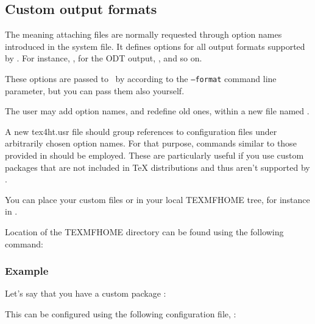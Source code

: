 
\subsection{Custom output formats}

The meaning attaching files are normally requested through option names
introduced in the  system file. It defines options for all output formats
supported by \texfourht. For instance, ,  for the ODT output,
, and so on. 

These options are passed to \texfourht\ by \makefourht according to the \texttt{--format} 
command line parameter, but you can pass them also yourself. 

The user may add option names, and redefine old ones, within a new file named .

A new tex4ht.usr file should group references to  configuration files
under arbitrarily chosen option names. For that purpose,  commands
similar to those provided in  should be employed. 
These are particularly useful if you use custom packages that are not included in TeX distributions
and thus aren't supported by \texfourht.

You can place your custom  files or  in your local TEXMFHOME tree, for instance
in .

Location of the TEXMFHOME directory can be found using the following command:


\subsubsection{Example}

Let's say that you have a custom package :


This can be configured using the following configuration file, :

